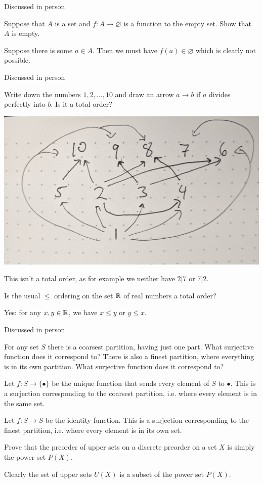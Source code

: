 Discussed in person

Suppose that $A$ is a set and $f : A \to\varnothing$  is a function to the empty set. Show that $A$ is empty.

\solution
Suppose there is some $a\in A$.  Then we must have $f(a)\in\varnothing$ which is clearly not possible.

Discussed in person

Write down the numbers $1,2,\dots,10$ and draw an arrow $a\to b$ if $a$ divides perfectly into $b$. Is it a total order?

\solution
\includegraphics[width=0.5\linewidth]{images/1-46.jpg}

This isn't a total order, as for example we neither have $2|7$ or $7|2$.

Is the usual $\leq$ ordering on the set $\mathbb{R}$ of real numbers a total order?

\solution
Yes: for any $x,y\in\mathbb{R}$, we have $x\leq y$ or $y\leq x$.

Discussed in person

For any set $S$ there is a coarsest partition, having just one part. What surjective function does it correspond to?
There is also a finest partition, where everything is in its own partition. What surjective function does it correspond to?

\solution
Let $f:S\to\{\bullet\}$ be the unique function that sends every element of $S$ to $\bullet$.  This is a surjection corresponding to the coarsest partition, i.e. where every element is in the same set.

Let $f: S\to S$ be the identity function.  This is a surjection corresponding to the finest partition, i.e. where every element is in its own set.

Prove that the preorder of upper sets on a discrete preorder on a set $X$ is simply the power set $P(X)$.

\solution
Clearly the set of upper sets $U(X)$ is a subset of the power set $P(X)$.

